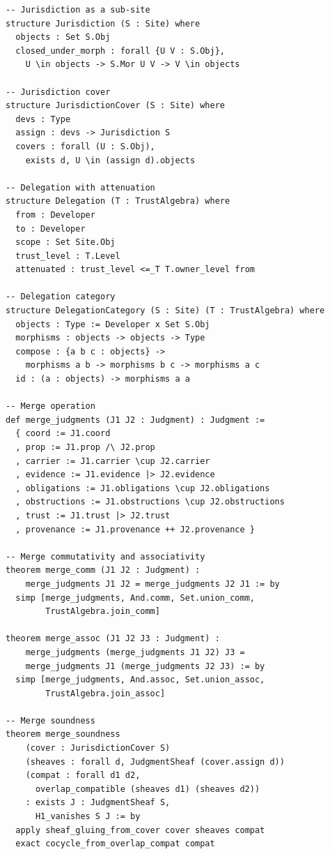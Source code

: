 \documentclass[11pt]{article}
\begin{document}
\begin{lstlisting}[basicstyle=\small\ttfamily,
  keywordstyle=\bfseries,frame=single,xleftmargin=1em,
  morekeywords={structure,theorem,def,where,forall,exists,by,apply,exact,
  induction,with,unfold,simp,Type,Set,Fintype,Finset}]
-- Jurisdiction as a sub-site
structure Jurisdiction (S : Site) where
  objects : Set S.Obj
  closed_under_morph : forall {U V : S.Obj},
    U \in objects -> S.Mor U V -> V \in objects

-- Jurisdiction cover
structure JurisdictionCover (S : Site) where
  devs : Type
  assign : devs -> Jurisdiction S
  covers : forall (U : S.Obj),
    exists d, U \in (assign d).objects

-- Delegation with attenuation
structure Delegation (T : TrustAlgebra) where
  from : Developer
  to : Developer
  scope : Set Site.Obj
  trust_level : T.Level
  attenuated : trust_level <=_T T.owner_level from

-- Delegation category
structure DelegationCategory (S : Site) (T : TrustAlgebra) where
  objects : Type := Developer x Set S.Obj
  morphisms : objects -> objects -> Type
  compose : {a b c : objects} ->
    morphisms a b -> morphisms b c -> morphisms a c
  id : (a : objects) -> morphisms a a

-- Merge operation
def merge_judgments (J1 J2 : Judgment) : Judgment :=
  { coord := J1.coord
  , prop := J1.prop /\ J2.prop
  , carrier := J1.carrier \cup J2.carrier
  , evidence := J1.evidence |> J2.evidence
  , obligations := J1.obligations \cup J2.obligations
  , obstructions := J1.obstructions \cup J2.obstructions
  , trust := J1.trust |> J2.trust
  , provenance := J1.provenance ++ J2.provenance }

-- Merge commutativity and associativity
theorem merge_comm (J1 J2 : Judgment) :
    merge_judgments J1 J2 = merge_judgments J2 J1 := by
  simp [merge_judgments, And.comm, Set.union_comm,
        TrustAlgebra.join_comm]

theorem merge_assoc (J1 J2 J3 : Judgment) :
    merge_judgments (merge_judgments J1 J2) J3 =
    merge_judgments J1 (merge_judgments J2 J3) := by
  simp [merge_judgments, And.assoc, Set.union_assoc,
        TrustAlgebra.join_assoc]

-- Merge soundness
theorem merge_soundness
    (cover : JurisdictionCover S)
    (sheaves : forall d, JudgmentSheaf (cover.assign d))
    (compat : forall d1 d2,
      overlap_compatible (sheaves d1) (sheaves d2))
    : exists J : JudgmentSheaf S,
      H1_vanishes S J := by
  apply sheaf_gluing_from_cover cover sheaves compat
  exact cocycle_from_overlap_compat compat


\end{lstlisting}
\end{document}
